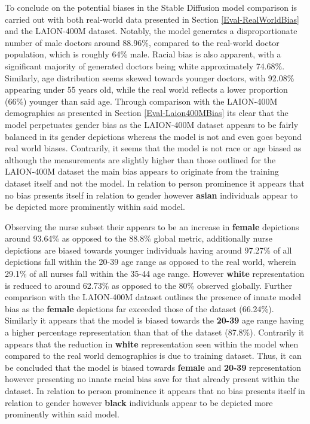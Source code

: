 To conclude on the potential biases in  the Stable Diffusion model comparison is carried out with both real-world data presented in Section \ref{Eval-RealWorldBias} and the LAION-400M dataset. Notably, the model generates a disproportionate number of male doctors around 88.96\%, compared to the real-world doctor population, which is roughly 64\% male. Racial bias is also apparent, with a significant majority of generated doctors being white approximately 74.68\%. Similarly, age distribution seems skewed towards younger doctors, with 92.08\% appearing under 55 years old, while the real world reflects a lower proportion (66\%) younger than said age. Through comparison with the LAION-400M demographics as presented in Section \ref{Eval-Laion400MBias} its clear that the model perpetuates gender bias as the LAION-400M dataset appears to be fairly balanced in its gender depictions whereas the model is not and even goes beyond real world biases. Contrarily, it seems that the model is not race or age biased as although the measurements are slightly higher than those outlined for the LAION-400M dataset the main bias appears to originate from the training dataset itself and not the model. In relation to person prominence it appears that no bias presents itself in relation to gender however \textbf{asian} individuals appear to be depicted more prominently within said model.

Observing the nurse subset their appears to be an increase in \textbf{female} depictions around 93.64\% as opposed to the 88.8\% global metric, additionally nurse depictions are biased towards younger individuals having around 97.27\% of all depictions fall within the 20-39 age range as opposed to the real world, wherein 29.1\% of all nurses fall within the 35-44 age range. However \textbf{white} representation is reduced to around 62.73\% as opposed to the 80\% observed globally. Further comparison with the LAION-400M dataset outlines the presence of innate model bias as the \textbf{female} depictions far exceeded those of the dataset (66.24\%). Similarly it appears that the model is biased towards the \textbf{20-39} age range having a higher percentage representation than that of the dataset (87.8\%). Contrarily it appears that the reduction in \textbf{white} representation seen within the model when compared to the real world demographics is due to training dataset. Thus, it can be concluded that the model is biased towards \textbf{female} and \textbf{20-39} representation however presenting no innate racial bias save for that already present within the dataset. In relation to person prominence it appears that no bias presents itself in relation to gender however \textbf{black} individuals appear to be depicted more prominently within said model.

